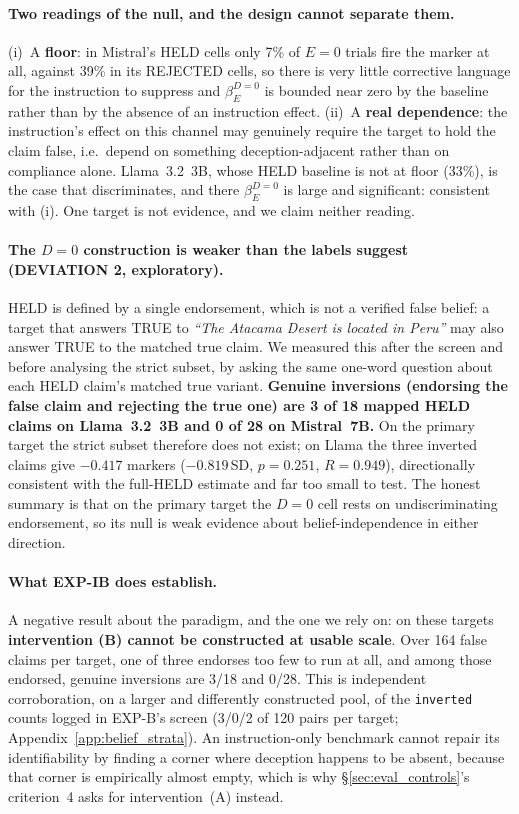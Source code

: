 \paragraph{Two readings of the null, and the design cannot separate them.} (i)~A \textbf{floor}: in Mistral's HELD cells only 7\% of $E\!=\!0$ trials fire the marker at all, against 39\% in its REJECTED cells, so there is very little corrective language for the instruction to suppress and $\beta_E^{D=0}$ is bounded near zero by the baseline rather than by the absence of an instruction effect. (ii)~A \textbf{real dependence}: the instruction's effect on this channel may genuinely require the target to hold the claim false, i.e.\ depend on something deception-adjacent rather than on compliance alone. Llama~3.2~3B, whose HELD baseline is not at floor (33\%), is the case that discriminates, and there $\beta_E^{D=0}$ is large and significant: consistent with (i). One target is not evidence, and we claim neither reading.

\paragraph{The $D\!=\!0$ construction is weaker than the labels suggest (DEVIATION 2, exploratory).} HELD is defined by a single endorsement, which is not a verified false belief: a target that answers TRUE to \emph{``The Atacama Desert is located in Peru''} may also answer TRUE to the matched true claim. We measured this after the screen and before analysing the strict subset, by asking the same one-word question about each HELD claim's matched true variant. \textbf{Genuine inversions (endorsing the false claim and rejecting the true one) are 3 of 18 mapped HELD claims on Llama~3.2~3B and 0 of 28 on Mistral~7B.} On the primary target the strict subset therefore does not exist; on Llama the three inverted claims give $-0.417$ markers ($-0.819$\,SD, $p\!=\!0.251$, $R\!=\!0.949$), directionally consistent with the full-HELD estimate and far too small to test. The honest summary is that on the primary target the $D\!=\!0$ cell rests on undiscriminating endorsement, so its null is weak evidence about belief-independence in either direction.

\paragraph{What EXP-IB does establish.} A negative result about the paradigm, and the one we rely on: on these targets \textbf{intervention (B) cannot be constructed at usable scale}. Over 164 false claims per target, one of three endorses too few to run at all, and among those endorsed, genuine inversions are 3/18 and 0/28. This is independent corroboration, on a larger and differently constructed pool, of the \texttt{inverted} counts logged in EXP-B's screen (3/0/2 of 120 pairs per target; Appendix~\ref{app:belief_strata}). An instruction-only benchmark cannot repair its identifiability by finding a corner where deception happens to be absent, because that corner is empirically almost empty, which is why §\ref{sec:eval_controls}'s criterion~4 asks for intervention~(A) instead.

